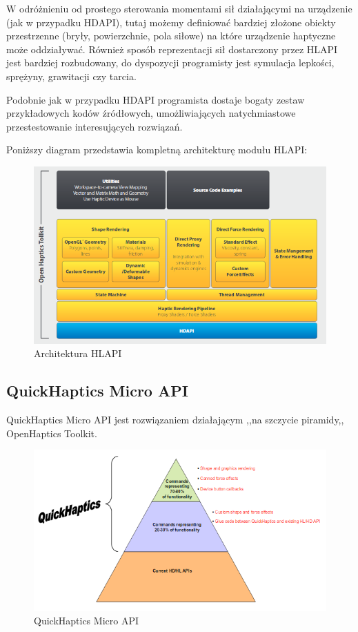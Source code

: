 \documentclass[licencjacka]{pracamgr}
\begin{document}
W odróżnieniu od prostego sterowania momentami sił działającymi na urządzenie (jak w przypadku HDAPI), tutaj możemy definiować bardziej złożone obiekty przestrzenne (bryły, powierzchnie, pola siłowe) na które urządzenie haptyczne może oddziaływać. Również sposób reprezentacji sił dostarczony przez HLAPI jest bardziej rozbudowany, do dyspozycji programisty jest symulacja lepkości, sprężyny, grawitacji czy tarcia.

Podobnie jak w przypadku HDAPI programista dostaje bogaty zestaw przykładowych kodów źródłowych, umożliwiających natychmiastowe przestestowanie interesujących rozwiązań.

Poniższy diagram przedstawia kompletną architekturę modułu HLAPI:

\begin{figure}[H]
\centering
\includegraphics[scale=0.65,center]{hlapi}
\caption{Architektura HLAPI}
\end{figure}

\subsection{QuickHaptics Micro API}
QuickHaptics Micro API jest rozwiązaniem działającym ,,na szczycie piramidy,, OpenHaptics Toolkit.
\begin{figure}[H]
\centering
\includegraphics[scale=0.6,center]{quickhaptics}
\caption{QuickHaptics Micro API}
\end{figure}
\end{document}
